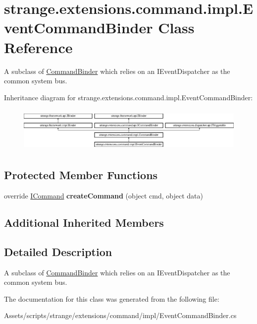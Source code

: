 \hypertarget{classstrange_1_1extensions_1_1command_1_1impl_1_1_event_command_binder}{\section{strange.\-extensions.\-command.\-impl.\-Event\-Command\-Binder Class Reference}
\label{classstrange_1_1extensions_1_1command_1_1impl_1_1_event_command_binder}
}


A subclass of \hyperlink{classstrange_1_1extensions_1_1command_1_1impl_1_1_command_binder}{Command\-Binder} which relies on an I\-Event\-Dispatcher as the common system bus.  


Inheritance diagram for strange.\-extensions.\-command.\-impl.\-Event\-Command\-Binder\-:\begin{figure}[H]
\begin{center}
\leavevmode
\includegraphics[height=2.222222cm]{classstrange_1_1extensions_1_1command_1_1impl_1_1_event_command_binder}
\end{center}
\end{figure}
\subsection*{Protected Member Functions}
\begin{DoxyCompactItemize}
\item 
\hypertarget{classstrange_1_1extensions_1_1command_1_1impl_1_1_event_command_binder_a94afde29529aaad8582557d7760d74a0}{override \hyperlink{interfacestrange_1_1extensions_1_1command_1_1api_1_1_i_command}{I\-Command} {\bfseries create\-Command} (object cmd, object data)}\label{classstrange_1_1extensions_1_1command_1_1impl_1_1_event_command_binder_a94afde29529aaad8582557d7760d74a0}

\end{DoxyCompactItemize}
\subsection*{Additional Inherited Members}


\subsection{Detailed Description}
A subclass of \hyperlink{classstrange_1_1extensions_1_1command_1_1impl_1_1_command_binder}{Command\-Binder} which relies on an I\-Event\-Dispatcher as the common system bus. 

The documentation for this class was generated from the following file\-:\begin{DoxyCompactItemize}
\item 
Assets/scripts/strange/extensions/command/impl/Event\-Command\-Binder.\-cs\end{DoxyCompactItemize}
